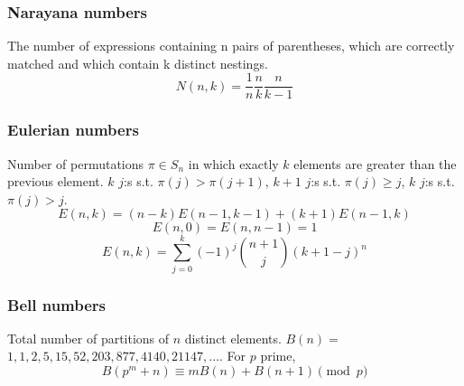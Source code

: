 \documentclass[
	a4paper,
	landscape,
	10pt,
]{article}
\begin{document}
\begin{multicols}{3}

	\subsubsection*{Narayana numbers} The number of expressions containing n pairs of parentheses, which are correctly matched and which contain k distinct nestings. 
		$$ N(n,k) = \frac{1}{n} \frac{n}{k} \frac{n}{k-1} $$

	\subsubsection*{Eulerian numbers}
		Number of permutations $\pi \in S_n$ in which exactly $k$ elements are greater than the previous element. $k$ $j$:s s.t. $\pi(j)>\pi(j+1)$, $k+1$ $j$:s s.t. $\pi(j)\geq j$, $k$ $j$:s s.t. $\pi(j)>j$.
		$$E(n,k) = (n-k)E(n-1,k-1) + (k+1)E(n-1,k)$$
		$$E(n,0) = E(n,n-1) = 1$$
		$$E(n,k) = \sum_{j=0}^k(-1)^j\binom{n+1}{j}(k+1-j)^n$$


	\subsubsection*{Bell numbers}
		Total number of partitions of $n$ distinct elements. $B(n) =$
		$1, 1, 2, 5, 15, 52, 203, 877, 4140, 21147, \dots$. For $p$ prime,
		\[ B(p^m+n)\equiv mB(n)+B(n+1) \pmod{p} \]


\end{multicols}
\end{document}
